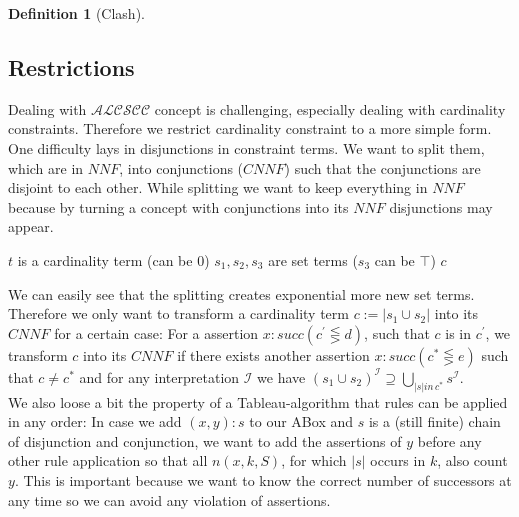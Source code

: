 \documentclass[a4paper,11pt]{scrartcl}
\theoremstyle{break}
\theoremstyle{definition}
\newtheorem{mydef}{Definition}
\begin{document}
\begin{mydef}[Clash]
\subsection{Restrictions}
Dealing with $\mathcal{ALCSCC}$ concept is challenging, especially dealing with cardinality constraints. Therefore we restrict cardinality constraint to a more simple form. One difficulty lays in disjunctions in constraint terms. We want to split them, which are in $NNF$, into conjunctions ($CNNF$) such that the conjunctions are disjoint to each other. While splitting we want to keep everything in $NNF$ because by turning a concept with conjunctions into its $NNF$ disjunctions may appear.\\
\begin{algorithm}[H]
	$t$ is a cardinality term (can be 0)\;
	$s_1,s_2,s_3$ are set terms ($s_3$ can be $\top$)\;
    \Return $c$\;
    \caption{$CNNF(c)$}
\end{algorithm}
We can easily see that the splitting creates exponential more new set terms. Therefore we only want to transform a cardinality term $c:=|s_1\cup s_2|$ into its $CNNF$ for a certain case:
For a assertion $x:succ(c^\prime\lesseqgtr d)$, such that $c$ is in $c^\prime$, we transform $c$ into its $CNNF$ if there exists another assertion $x:succ(c^\ast\lesseqgtr e)$ such that $c\neq c^\ast$ and for any interpretation $\mathcal{I}$ we have $(s_1\cup s_2)^\mathcal{I}\supseteq \bigcup_{|s|in\,c^\ast}s^\mathcal{I}$.\\
We also loose a bit the property of a Tableau-algorithm that rules can be applied in any order: In case we add $(x,y):s$ to our ABox and $s$ is a (still finite) chain of disjunction and conjunction, we want to add the assertions of $y$ before any other rule application so that all $n(x,k,S)$, for which $|s|$ occurs in $k$, also count $y$. This is important because we want to know the correct number of successors at any time so we can avoid any violation of assertions.

\end{mydef}
\end{document}
